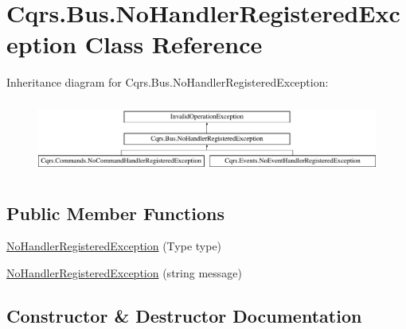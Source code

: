 \hypertarget{classCqrs_1_1Bus_1_1NoHandlerRegisteredException}{}\section{Cqrs.\+Bus.\+No\+Handler\+Registered\+Exception Class Reference}
\label{classCqrs_1_1Bus_1_1NoHandlerRegisteredException}
Inheritance diagram for Cqrs.\+Bus.\+No\+Handler\+Registered\+Exception\+:\begin{figure}[H]
\begin{center}
\leavevmode
\includegraphics[height=2.427746cm]{classCqrs_1_1Bus_1_1NoHandlerRegisteredException}
\end{center}
\end{figure}
\subsection*{Public Member Functions}
\begin{DoxyCompactItemize}
\item 
\hyperlink{classCqrs_1_1Bus_1_1NoHandlerRegisteredException_ae74b3c88aed92d6bf354a5aaf4b42e13_ae74b3c88aed92d6bf354a5aaf4b42e13}{No\+Handler\+Registered\+Exception} (Type type)
\item 
\hyperlink{classCqrs_1_1Bus_1_1NoHandlerRegisteredException_a6f163c9b3fe405f817f97ac8187bf691_a6f163c9b3fe405f817f97ac8187bf691}{No\+Handler\+Registered\+Exception} (string message)
\end{DoxyCompactItemize}


\subsection{Constructor \& Destructor Documentation}
\mbox{\label{classCqrs_1_1Bus_1_1NoHandlerRegisteredException_ae74b3c88aed92d6bf354a5aaf4b42e13_ae74b3c88aed92d6bf354a5aaf4b42e13}} 
